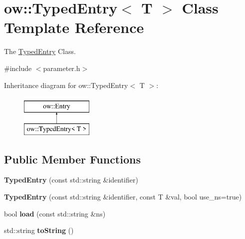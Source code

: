 \hypertarget{classow_1_1TypedEntry}{}\section{ow\+:\+:Typed\+Entry$<$ T $>$ Class Template Reference}
\label{classow_1_1TypedEntry}


The \hyperlink{classow_1_1TypedEntry}{Typed\+Entry} Class.  




{\ttfamily \#include $<$parameter.\+h$>$}

Inheritance diagram for ow\+:\+:Typed\+Entry$<$ T $>$\+:\begin{figure}[H]
\begin{center}
\leavevmode
\includegraphics[height=2.000000cm]{d4/dac/classow_1_1TypedEntry}
\end{center}
\end{figure}
\subsection*{Public Member Functions}
\begin{DoxyCompactItemize}
\item 
{\bfseries Typed\+Entry} (const std\+::string \&identifier)\hypertarget{classow_1_1TypedEntry_ac9fb19d6e4dd9a4b5ea95ab6501520ab}{}\label{classow_1_1TypedEntry_ac9fb19d6e4dd9a4b5ea95ab6501520ab}

\item 
{\bfseries Typed\+Entry} (const std\+::string \&identifier, const T \&val, bool use\+\_\+ns=true)\hypertarget{classow_1_1TypedEntry_aed6b3f6075000d3c135e8fc3ee425778}{}\label{classow_1_1TypedEntry_aed6b3f6075000d3c135e8fc3ee425778}

\item 
bool {\bfseries load} (const std\+::string \&ns)\hypertarget{classow_1_1TypedEntry_a0f028afdcb1e93df078e70036a477776}{}\label{classow_1_1TypedEntry_a0f028afdcb1e93df078e70036a477776}

\item 
std\+::string {\bfseries to\+String} ()\hypertarget{classow_1_1TypedEntry_a1fc71e4aa184b2bf668da35f9e6dd4ab}{}\label{classow_1_1TypedEntry_a1fc71e4aa184b2bf668da35f9e6dd4ab}

\end{DoxyCompactItemize}
